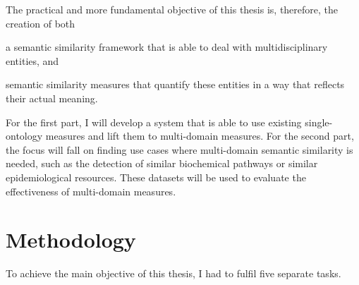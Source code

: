 The practical and more fundamental objective of this thesis is, therefore, the creation of both
\begin{paralist}
    \item a semantic similarity framework that is able to deal with multidisciplinary entities, and
    \item semantic similarity measures that quantify these entities in a way that reflects their actual meaning.
\end{paralist}
For the first part, I will develop a system that is able to use existing single-ontology measures and lift them to multi-domain measures. For the second part, the focus will fall on finding use cases where multi-domain semantic similarity is needed, such as the detection of similar biochemical pathways or similar epidemiological resources. These datasets will be used to evaluate the effectiveness of multi-domain measures.



\section{Methodology} \label{sec:intro/methodology}

To achieve the main objective of this thesis, I had to fulfil five separate tasks.


